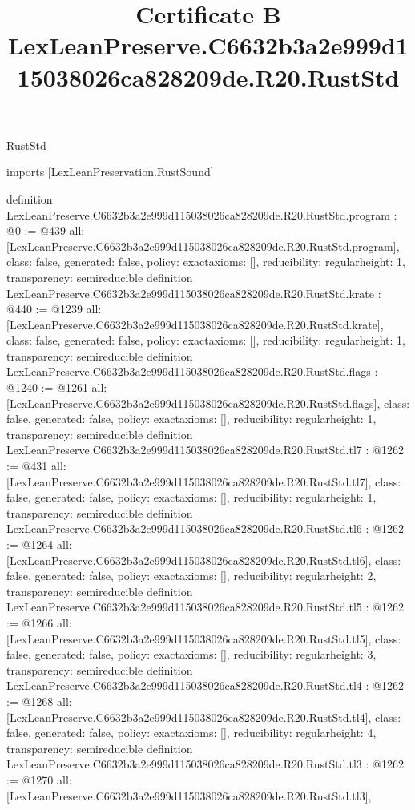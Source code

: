 \begin{lexlean}{RustStd}
\title{Certificate B LexLeanPreserve.C6632b3a2e999d115038026ca828209de.R20.RustStd}
\begin{coremodule}
imports [LexLeanPreservation.RustSound]

definition LexLeanPreserve.C6632b3a2e999d115038026ca828209de.R20.RustStd.program : @0 := @439 {
  all: [LexLeanPreserve.C6632b3a2e999d115038026ca828209de.R20.RustStd.program],
  class: false,
  generated: false,
  policy: exact{axioms: []},
  reducibility: regular{height: 1},
  transparency: semireducible
}
definition LexLeanPreserve.C6632b3a2e999d115038026ca828209de.R20.RustStd.krate : @440 := @1239 {
  all: [LexLeanPreserve.C6632b3a2e999d115038026ca828209de.R20.RustStd.krate],
  class: false,
  generated: false,
  policy: exact{axioms: []},
  reducibility: regular{height: 1},
  transparency: semireducible
}
definition LexLeanPreserve.C6632b3a2e999d115038026ca828209de.R20.RustStd.flags : @1240 := @1261 {
  all: [LexLeanPreserve.C6632b3a2e999d115038026ca828209de.R20.RustStd.flags],
  class: false,
  generated: false,
  policy: exact{axioms: []},
  reducibility: regular{height: 1},
  transparency: semireducible
}
definition LexLeanPreserve.C6632b3a2e999d115038026ca828209de.R20.RustStd.tl7 : @1262 := @431 {
  all: [LexLeanPreserve.C6632b3a2e999d115038026ca828209de.R20.RustStd.tl7],
  class: false,
  generated: false,
  policy: exact{axioms: []},
  reducibility: regular{height: 1},
  transparency: semireducible
}
definition LexLeanPreserve.C6632b3a2e999d115038026ca828209de.R20.RustStd.tl6 : @1262 := @1264 {
  all: [LexLeanPreserve.C6632b3a2e999d115038026ca828209de.R20.RustStd.tl6],
  class: false,
  generated: false,
  policy: exact{axioms: []},
  reducibility: regular{height: 2},
  transparency: semireducible
}
definition LexLeanPreserve.C6632b3a2e999d115038026ca828209de.R20.RustStd.tl5 : @1262 := @1266 {
  all: [LexLeanPreserve.C6632b3a2e999d115038026ca828209de.R20.RustStd.tl5],
  class: false,
  generated: false,
  policy: exact{axioms: []},
  reducibility: regular{height: 3},
  transparency: semireducible
}
definition LexLeanPreserve.C6632b3a2e999d115038026ca828209de.R20.RustStd.tl4 : @1262 := @1268 {
  all: [LexLeanPreserve.C6632b3a2e999d115038026ca828209de.R20.RustStd.tl4],
  class: false,
  generated: false,
  policy: exact{axioms: []},
  reducibility: regular{height: 4},
  transparency: semireducible
}
definition LexLeanPreserve.C6632b3a2e999d115038026ca828209de.R20.RustStd.tl3 : @1262 := @1270 {
  all: [LexLeanPreserve.C6632b3a2e999d115038026ca828209de.R20.RustStd.tl3],
}
\end{coremodule}
\end{lexlean}

